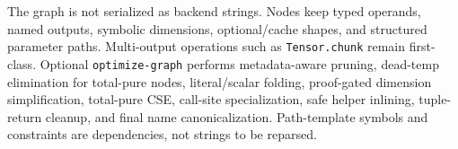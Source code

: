 \documentclass{article}
\newcommand{\code}[1]{\texttt{#1}}
\begin{document}
\begin{minipage}[t]{0.49\linewidth}
\begin{tcolorbox}[posterbox,title={Graph IR}]
{\raggedright\fontsize{19.5}{24.5}\selectfont
The graph is not serialized as backend strings. Nodes keep typed operands,
named outputs, symbolic dimensions, optional/cache shapes, and structured
parameter paths. Multi-output operations such as \code{Tensor.chunk} remain
first-class. Optional \code{optimize-graph} performs metadata-aware pruning,
dead-temp elimination for total-pure nodes, literal/scalar folding, proof-gated
dimension simplification, total-pure CSE, call-site specialization, safe helper
inlining, tuple-return cleanup, and final name canonicalization. Path-template
symbols and constraints are dependencies, not strings to be reparsed.\par}
\end{tcolorbox}
\end{minipage}

\vspace{8mm}
\end{document}
